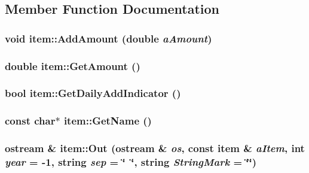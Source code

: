 \subsection{Member Function Documentation}
\hypertarget{classitem_a8765b474f72992061b8da66069561f58}{
\subsubsection[{AddAmount}]{\setlength{\rightskip}{0pt plus 5cm}void item::AddAmount (double {\em aAmount})}}
\label{classitem_a8765b474f72992061b8da66069561f58}
\hypertarget{classitem_af896af977922b815bf0c0804730efa00}{
\subsubsection[{GetAmount}]{\setlength{\rightskip}{0pt plus 5cm}double item::GetAmount ()}}
\label{classitem_af896af977922b815bf0c0804730efa00}
\hypertarget{classitem_a5b7d72aefcf7ee42674595f42b6d13cb}{
\subsubsection[{GetDailyAddIndicator}]{\setlength{\rightskip}{0pt plus 5cm}bool item::GetDailyAddIndicator ()}}
\label{classitem_a5b7d72aefcf7ee42674595f42b6d13cb}
\hypertarget{classitem_abac2736ce9cdac104f0fb088c8a8b12e}{
\subsubsection[{GetName}]{\setlength{\rightskip}{0pt plus 5cm}const char$\ast$ item::GetName ()}}
\label{classitem_abac2736ce9cdac104f0fb088c8a8b12e}
\hypertarget{classitem_a68fcb42c6712e5eb6fd73b7cddefbd93}{
\subsubsection[{Out}]{\setlength{\rightskip}{0pt plus 5cm}ostream \& item::Out (ostream \& {\em os}, \/  const {\bf item} \& {\em aItem}, \/  int {\em year} = {\ttfamily -\/1}, \/  string {\em sep} = {\ttfamily \char`\"{}~\char`\"{}}, \/  string {\em StringMark} = {\ttfamily \char`\"{}\char`\"{}})}}
